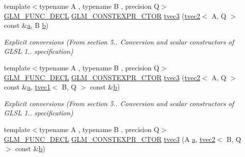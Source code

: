 \begin{DoxyCompactItemize}
\item 
{\footnotesize template$<$typename A , typename B , precision Q$>$ }\\\mbox{\hyperlink{setup_8hpp_ab2d052de21a70539923e9bcbf6e83a51}{G\+L\+M\+\_\+\+F\+U\+N\+C\+\_\+\+D\+E\+CL}} \mbox{\hyperlink{setup_8hpp_ad34178a09666081abdb573c14d1f4a5a}{G\+L\+M\+\_\+\+C\+O\+N\+S\+T\+E\+X\+P\+R\+\_\+\+C\+T\+OR}} \mbox{\hyperlink{structglm_1_1tvec3_a94293c28f040fc93d3f22cbb9d8b6a54}{tvec3}} (\mbox{\hyperlink{structglm_1_1tvec2}{tvec2}}$<$ A, Q $>$ const \&\mbox{\hyperlink{glad_8h_ac8729153468b5dcf13f971b21d84d4e5}{a}}, B \mbox{\hyperlink{glad_8h_a6eba317e3cf44d6d26c04a5a8f197dcb}{b}})
\begin{DoxyCompactList}\small\item\em Explicit conversions (From section 5.. Conversion and scalar constructors of G\+L\+SL 1.. specification) \end{DoxyCompactList}\item 
{\footnotesize template$<$typename A , typename B , precision Q$>$ }\\\mbox{\hyperlink{setup_8hpp_ab2d052de21a70539923e9bcbf6e83a51}{G\+L\+M\+\_\+\+F\+U\+N\+C\+\_\+\+D\+E\+CL}} \mbox{\hyperlink{setup_8hpp_ad34178a09666081abdb573c14d1f4a5a}{G\+L\+M\+\_\+\+C\+O\+N\+S\+T\+E\+X\+P\+R\+\_\+\+C\+T\+OR}} \mbox{\hyperlink{structglm_1_1tvec3_a06dbab521ff9e13874fcf9c2ccac832f}{tvec3}} (\mbox{\hyperlink{structglm_1_1tvec2}{tvec2}}$<$ A, Q $>$ const \&\mbox{\hyperlink{glad_8h_ac8729153468b5dcf13f971b21d84d4e5}{a}}, \mbox{\hyperlink{structglm_1_1tvec1}{tvec1}}$<$ B, Q $>$ const \&\mbox{\hyperlink{glad_8h_a6eba317e3cf44d6d26c04a5a8f197dcb}{b}})
\begin{DoxyCompactList}\small\item\em Explicit conversions (From section 5.. Conversion and scalar constructors of G\+L\+SL 1.. specification) \end{DoxyCompactList}\item 
{\footnotesize template$<$typename A , typename B , precision Q$>$ }\\\mbox{\hyperlink{setup_8hpp_ab2d052de21a70539923e9bcbf6e83a51}{G\+L\+M\+\_\+\+F\+U\+N\+C\+\_\+\+D\+E\+CL}} \mbox{\hyperlink{setup_8hpp_ad34178a09666081abdb573c14d1f4a5a}{G\+L\+M\+\_\+\+C\+O\+N\+S\+T\+E\+X\+P\+R\+\_\+\+C\+T\+OR}} \mbox{\hyperlink{structglm_1_1tvec3_ac78c68860f00256ff44c73e7917d70f5}{tvec3}} (A \mbox{\hyperlink{glad_8h_ac8729153468b5dcf13f971b21d84d4e5}{a}}, \mbox{\hyperlink{structglm_1_1tvec2}{tvec2}}$<$ B, Q $>$ const \&\mbox{\hyperlink{glad_8h_a6eba317e3cf44d6d26c04a5a8f197dcb}{b}})

\end{DoxyCompactItemize}
